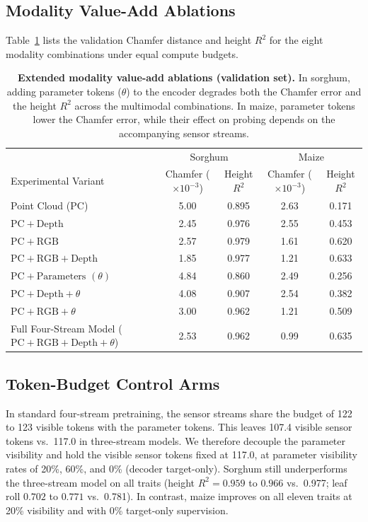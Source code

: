 \documentclass[10pt,twocolumn,letterpaper]{article}
\begin{document}
\subsection{Modality Value-Add Ablations}
Table~\ref{tab:supp-e2} lists the validation Chamfer distance and height $R^2$ for the eight modality combinations under equal compute budgets.

\begin{table}[t]
  \caption{\textbf{Extended modality value-add ablations (validation set).} In sorghum, adding parameter tokens ($\theta$) to the encoder degrades both the Chamfer error and the height $R^2$ across the multimodal combinations. In maize, parameter tokens lower the Chamfer error, while their effect on probing depends on the accompanying sensor streams.}
  \label{tab:supp-e2}
  \centering\small
  \begin{tabular}{lcccc}
  \toprule
   & \multicolumn{2}{c}{Sorghum} & \multicolumn{2}{c}{Maize} \\
  Experimental Variant & Chamfer ($\times10^{-3}$) & Height $R^2$ & Chamfer ($\times10^{-3}$) & Height $R^2$ \\
  \midrule
  Point Cloud ($\mathrm{PC}$) & 5.00 & 0.895 & 2.63 & 0.171 \\
  $\mathrm{PC} + \text{Depth}$ & 2.45 & 0.976 & 2.55 & 0.453 \\
  $\mathrm{PC} + \text{RGB}$ & 2.57 & 0.979 & 1.61 & 0.620 \\
  $\mathrm{PC} + \text{RGB} + \text{Depth}$ & 1.85 & 0.977 & 1.21 & 0.633 \\
  $\mathrm{PC} + \text{Parameters } (\theta)$ & 4.84 & 0.860 & 2.49 & 0.256 \\
  $\mathrm{PC} + \text{Depth} + \theta$ & 4.08 & 0.907 & 2.54 & 0.382 \\
  $\mathrm{PC} + \text{RGB} + \theta$ & 3.00 & 0.962 & 1.21 & 0.509 \\
  Full Four-Stream Model ($\mathrm{PC} + \text{RGB} + \text{Depth} + \theta$) & 2.53 & 0.962 & 0.99 & 0.635 \\
  \bottomrule
  \end{tabular}
\end{table}

\subsection{Token-Budget Control Arms}
In standard four-stream pretraining, the sensor streams share the budget of 122 to 123 visible tokens with the parameter tokens. This leaves 107.4 visible sensor tokens vs.\ 117.0 in three-stream models. We therefore decouple the parameter visibility and hold the visible sensor tokens fixed at 117.0, at parameter visibility rates of 20\%, 60\%, and 0\% (decoder target-only). Sorghum still underperforms the three-stream model on all traits (height $R^2 = 0.959$ to $0.966$ vs.\ 0.977; leaf roll $0.702$ to $0.771$ vs.\ 0.781). In contrast, maize improves on all eleven traits at 20\% visibility and with 0\% target-only supervision.
\end{document}
